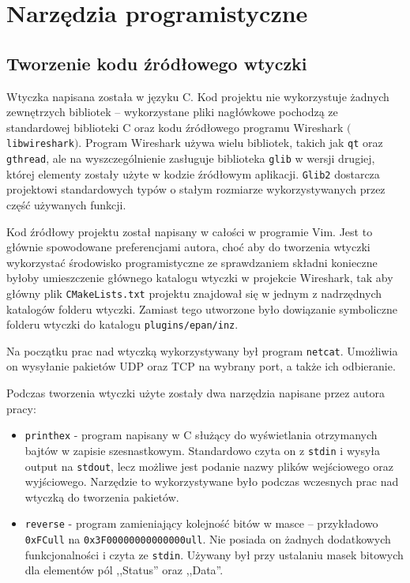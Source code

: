 \documentclass[a4paper, 12pt, twoside, openright]{article}
\begin{document}
\newpage
\section{Narzędzia programistyczne}

	\subsection{Tworzenie kodu źródłowego wtyczki}
	\indent\par
	Wtyczka napisana została w języku C. Kod projektu nie wykorzystuje żadnych zewnętrzych bibliotek -- wykorzystane pliki nagłówkowe
	pochodzą ze standardowej biblioteki C oraz kodu źródłowego programu Wireshark $($\texttt{libwireshark}$)$.
	Program Wireshark używa wielu bibliotek, takich jak \texttt{qt} oraz \texttt{gthread}, ale na wyszczególnienie zasługuje biblioteka
	\texttt{glib} w wersji drugiej, której
	elementy zostały użyte w kodzie źródłowym aplikacji. \texttt{Glib2} dostarcza projektowi standardowych typów o stałym
	rozmiarze wykorzystywanych przez część używanych funkcji.

	Kod źródłowy projektu został napisany w całości w programie Vim. Jest to głównie spowodowane preferencjami autora,
	choć aby do tworzenia wtyczki wykorzystać środowisko programistyczne ze sprawdzaniem składni konieczne byłoby umieszczenie
	głównego katalogu wtyczki w projekcie Wireshark, tak aby główny plik \texttt{CMakeLists.txt} projektu znajdował się w jednym
	z nadrzędnych katalogów folderu wtyczki. Zamiast tego utworzone było dowiązanie symboliczne folderu wtyczki do katalogu
	\texttt{plugins/epan/inz}.

	Na początku prac nad wtyczką wykorzystywany był program \texttt{netcat}. Umożliwia on wysyłanie pakietów
	UDP oraz TCP na wybrany port, a także ich odbieranie.

	Podczas tworzenia wtyczki użyte zostały dwa narzędzia napisane przez autora pracy:
	\begin{itemize}
		\item \texttt{printhex} - program napisany w C służący do wyświetlania otrzymanych bajtów w zapisie szesnastkowym. Standardowo
			czyta on z \texttt{stdin} i wysyła output na \texttt{stdout}, lecz możliwe jest podanie nazwy plików wejściowego oraz wyjściowego. Narzędzie
			to wykorzystywane było podczas wczesnych prac nad wtyczką do tworzenia pakietów.
		\item \texttt{reverse} - program zamieniający kolejność bitów w masce -- przykładowo \texttt{0xFCull} na \texttt{0x3F00000000000000ull}.
			Nie posiada on żadnych dodatkowych funkcjonalności i czyta ze \texttt{stdin}. Używany był przy ustalaniu masek bitowych dla elementów pól
			,,Status'' oraz ,,Data''.
	\end{itemize}
\end{document}
